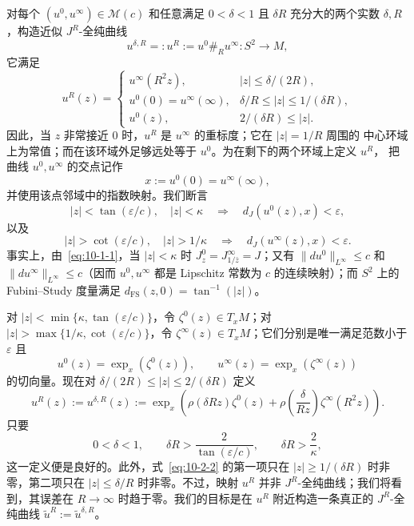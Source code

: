 对每个 $(u^0,u^\infty)\in\mathcal M(c)$ 和任意满足 $0<\delta<1$ 且 $\delta R$
充分大的两个实数 $\delta,R$，构造近似 $J^R$-全纯曲线
\[
  u^{\delta,R}=:u^R:=u^0\mathbin{\#_R}u^\infty:S^2\longrightarrow M,
\]
它满足
\begin{equation}\label{eq:10-2-1}
  u^R(z)=
  \begin{cases}
    u^\infty(R^2z),& |z|\le\delta/(2R),\\
    u^0(0)=u^\infty(\infty),& \delta/R\le|z|\le1/(\delta R),\\
    u^0(z),& 2/(\delta R)\le|z|.
  \end{cases}
\end{equation}
因此，当 $z$ 非常接近 $0$ 时，$u^R$ 是 $u^\infty$ 的重标度；它在 $|z|=1/R$ 周围的
中心环域上为常值；而在该环域外足够远处等于 $u^0$。为在剩下的两个环域上定义 $u^R$，
把曲线 $u^0,u^\infty$ 的交点记作
\[
  x:=u^0(0)=u^\infty(\infty),
\]
并使用该点邻域中的指数映射。我们断言
\[
  |z|<\tan(\varepsilon/c),\quad |z|<\kappa
  \quad\Longrightarrow\quad
  d_J(u^0(z),x)<\varepsilon,
\]
以及
\[
  |z|>\cot(\varepsilon/c),\quad |z|>1/\kappa
  \quad\Longrightarrow\quad
  d_J(u^\infty(z),x)<\varepsilon.
\]
事实上，由~\eqref{eq:10-1-1}，当 $|z|<\kappa$ 时
$J_z^0=J_{1/\bar z}^\infty=J$；又有
$\|du^0\|_{L^\infty}\le c$ 和 $\|du^\infty\|_{L^\infty}\le c$（因而 $u^0,u^\infty$
都是 Lipschitz 常数为 $c$ 的连续映射）；而 $S^2$ 上的 Fubini--Study 度量满足
$d_{\mathrm{FS}}(z,0)=\tan^{-1}(|z|)$。

对 $|z|<\min\{\kappa,\tan(\varepsilon/c)\}$，令
$\zeta^0(z)\in T_xM$；对
$|z|>\max\{1/\kappa,\cot(\varepsilon/c)\}$，令
$\zeta^\infty(z)\in T_xM$；它们分别是唯一满足范数小于 $\varepsilon$ 且
\[
  u^0(z)=\exp_x(\zeta^0(z)),
  \qquad
  u^\infty(z)=\exp_x(\zeta^\infty(z))
\]
的切向量。现在对 $\delta/(2R)\le|z|\le2/(\delta R)$ 定义
\begin{equation}\label{eq:10-2-2}
  u^R(z):=u^{\delta,R}(z)
  :=\exp_x\left(
    \rho(\delta Rz)\zeta^0(z)
    +\rho\left(\frac{\delta}{Rz}\right)\zeta^\infty(R^2z)
  \right).
\end{equation}
只要
\begin{equation}\label{eq:10-2-3}
  0<\delta<1,
  \qquad
  \delta R>\frac{2}{\tan(\varepsilon/c)},
  \qquad
  \delta R>\frac{2}{\kappa},
\end{equation}
这一定义便是良好的。此外，式~\eqref{eq:10-2-2} 的第一项只在 $|z|\ge1/(\delta R)$
时非零，第二项只在 $|z|\le\delta/R$ 时非零。不过，映射 $u^R$ 并非
$J^R$-全纯曲线；我们将看到，其误差在 $R\to\infty$ 时趋于零。我们的目标是在 $u^R$
附近构造一条真正的 $J^R$-全纯曲线 $\widetilde u^R:=\widetilde u^{\delta,R}$。

